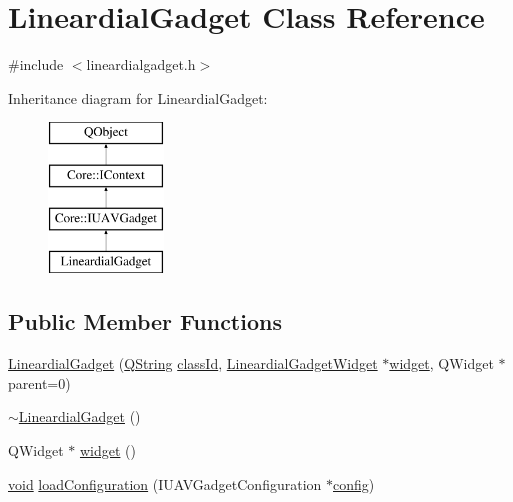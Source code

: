 \hypertarget{class_lineardial_gadget}{\section{Lineardial\-Gadget Class Reference}
\label{class_lineardial_gadget}
}


{\ttfamily \#include $<$lineardialgadget.\-h$>$}

Inheritance diagram for Lineardial\-Gadget\-:\begin{figure}[H]
\begin{center}
\leavevmode
\includegraphics[height=4.000000cm]{class_lineardial_gadget}
\end{center}
\end{figure}
\subsection*{Public Member Functions}
\begin{DoxyCompactItemize}
\item 
\hyperlink{group___linear_dial_plugin_gae00c0aad0b87c017df5b0305d6fb1c5b}{Lineardial\-Gadget} (\hyperlink{group___u_a_v_objects_plugin_gab9d252f49c333c94a72f97ce3105a32d}{Q\-String} \hyperlink{group___core_plugin_ga3878fde66a57220608960bcc3fbeef2c}{class\-Id}, \hyperlink{class_lineardial_gadget_widget}{Lineardial\-Gadget\-Widget} $\ast$\hyperlink{group___linear_dial_plugin_ga65e61a0bf52e2ab9b2fe4ba7e3ae3b96}{widget}, Q\-Widget $\ast$parent=0)
\item 
\hyperlink{group___linear_dial_plugin_gaee31b5207ca412de6722401f392a8fd0}{$\sim$\-Lineardial\-Gadget} ()
\item 
Q\-Widget $\ast$ \hyperlink{group___linear_dial_plugin_ga65e61a0bf52e2ab9b2fe4ba7e3ae3b96}{widget} ()
\item 
\hyperlink{group___u_a_v_objects_plugin_ga444cf2ff3f0ecbe028adce838d373f5c}{void} \hyperlink{group___linear_dial_plugin_ga6bdccc9d4347fd8f04ea5e893877a30f}{load\-Configuration} (I\-U\-A\-V\-Gadget\-Configuration $\ast$\hyperlink{deflate_8c_a4473b5227787415097004fd39f55185e}{config})
\end{DoxyCompactItemize}
